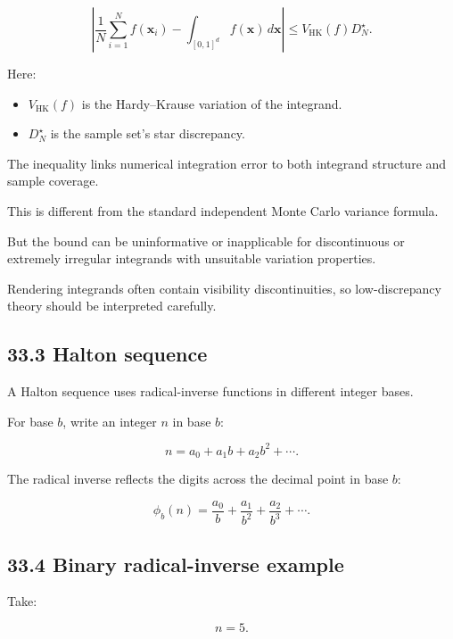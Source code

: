 \[ \boxed{ \left| \frac1N\sum_{i=1}^{N}f(\mathbf x_i) - \int_{[0,1]^d}f(\mathbf x)\,d\mathbf x \right| \le V_{\mathrm{HK}}(f)D_N^\star }. \]

Here:

\begin{itemize}
\tightlist
\item
  \(V_{\mathrm{HK}}(f)\) is the Hardy--Krause variation of the integrand.
\item
  \(D_N^\star\) is the sample set's star discrepancy.
\end{itemize}

The inequality links numerical integration error to both integrand structure and sample coverage.

This is different from the standard independent Monte Carlo variance formula.

But the bound can be uninformative or inapplicable for discontinuous or extremely irregular integrands with unsuitable variation properties.

Rendering integrands often contain visibility discontinuities, so low-discrepancy theory should be interpreted carefully.

\subsection{33.3 Halton sequence}\label{02-foundations-ii-ch031-halton-sequence}

\hypertarget{02-foundations-ii-ch031-halton-sequence}{}

A Halton sequence uses radical-inverse functions in different integer bases.

For base \(b\), write an integer \(n\) in base \(b\):

\[ n=a_0+a_1b+a_2b^2+\cdots. \]

The radical inverse reflects the digits across the decimal point in base \(b\):

\[ \boxed{ \phi_b(n)= \frac{a_0}{b}+ \frac{a_1}{b^2}+ \frac{a_2}{b^3}+\cdots }. \]

\subsection{33.4 Binary radical-inverse example}\label{02-foundations-ii-ch031-binary-radical-inverse-example}

\hypertarget{02-foundations-ii-ch031-binary-radical-inverse-example}{}

Take:

\[ n=5. \]

